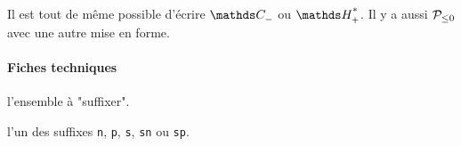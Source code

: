 \documentclass[12pt,a4paper]{article}
\begin{document}
\begin{tcblisting}{}
Il est tout de même possible d'écrire $\setspecial{\CC}{n}$ ou $\setspecial{\HH}{sp}$.
Il y a aussi $\setspecial*{\setproba{P}}{n}$ avec une autre mise en forme.
\end{tcblisting}


\paragraph{Fiches techniques}



 l'ensemble à "suffixer".

 l'un des suffixes \verb+n+, \verb+p+, \verb+s+, \verb+sn+ ou \verb+sp+.
\end{document}
